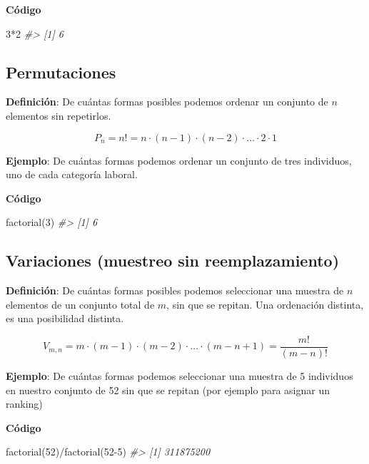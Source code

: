 \documentclass[
]{book}
\newenvironment{Shaded}{\begin{snugshade}}{\end{snugshade}}
\newcommand{\CommentTok}[1]{\textcolor[rgb]{0.56,0.35,0.01}{\textit{#1}}}
\newcommand{\DecValTok}[1]{\textcolor[rgb]{0.00,0.00,0.81}{#1}}
\newcommand{\FunctionTok}[1]{\textcolor[rgb]{0.00,0.00,0.00}{#1}}
\newcommand{\NormalTok}[1]{#1}
\newcommand{\SpecialCharTok}[1]{\textcolor[rgb]{0.00,0.00,0.00}{#1}}
\begin{document}
\textbf{Código}

\begin{Shaded}
\begin{Highlighting}[]
\DecValTok{3}\SpecialCharTok{*}\DecValTok{2}
\CommentTok{\#\textgreater{} [1] 6}
\end{Highlighting}
\end{Shaded}

\hypertarget{permutaciones}{%
\subsection{Permutaciones}\label{permutaciones}}

\textbf{Definición}: De cuántas formas posibles podemos ordenar un
conjunto de \(n\) elementos sin repetirlos.

\[P_n = n! = n\cdot(n-1)\cdot(n-2)\cdot\ldots\cdot 2\cdot 1\]

\textbf{Ejemplo}: De cuántas formas podemos ordenar un conjunto de
tres individuos, uno de cada categoría laboral.

\textbf{Código}

\begin{Shaded}
\begin{Highlighting}[]
\FunctionTok{factorial}\NormalTok{(}\DecValTok{3}\NormalTok{)}
\CommentTok{\#\textgreater{} [1] 6}
\end{Highlighting}
\end{Shaded}

\hypertarget{variaciones-muestreo-sin-reemplazamiento}{%
\subsection{Variaciones (muestreo sin reemplazamiento)}\label{variaciones-muestreo-sin-reemplazamiento}}

\textbf{Definición}: De cuántas formas posibles podemos seleccionar
una muestra de \(n\) elementos de un conjunto total de \(m\), sin que se
repitan. Una ordenación distinta, es una posibilidad distinta.

\[V_{m,n} = m\cdot(m-1)\cdot(m-2)\cdot\ldots\cdot (m-n+1) = \frac{m!}{(m-n)!}\]

\textbf{Ejemplo}: De cuántas formas podemos seleccionar una muestra
de 5 individuos en nuestro conjunto de 52 sin que se repitan (por
ejemplo para asignar un ranking)

\textbf{Código}

\begin{Shaded}
\begin{Highlighting}[]
\FunctionTok{factorial}\NormalTok{(}\DecValTok{52}\NormalTok{)}\SpecialCharTok{/}\FunctionTok{factorial}\NormalTok{(}\DecValTok{52{-}5}\NormalTok{)}
\CommentTok{\#\textgreater{} [1] 311875200}
\end{Highlighting}
\end{Shaded}
\end{document}
